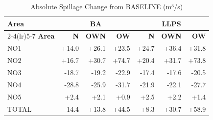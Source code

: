 \begin{table}[htbp]
\centering
\caption{Absolute Spillage Change from BASELINE (m³/s)}
\label{tab:spillage_abs_change}
\small
\begin{tabular}{lrrrrrr}
\toprule
\textbf{Area} & \multicolumn{3}{c}{\textbf{BA}} & \multicolumn{3}{c}{\textbf{LLPS}} \\
\cmidrule(lr){2-4}\cmidrule(lr){5-7}
\textbf{Area} & \textbf{N} & \textbf{OWN} & \textbf{OW} & \textbf{N} & \textbf{OWN} & \textbf{OW} \\
\midrule
NO1 & +14.0 & +26.1 & +23.5 & +24.7 & +36.4 & +31.8 \\
NO2 & +16.7 & +30.7 & +74.7 & +20.4 & +31.7 & +73.8 \\
NO3 & -18.7 & -19.2 & -22.9 & -17.4 & -17.6 & -20.5 \\
NO4 & -28.8 & -25.9 & -31.7 & -21.9 & -22.1 & -27.7 \\
NO5 & +2.4 & +2.1 & +0.9 & +2.5 & +2.2 & +1.4 \\
TOTAL & -14.4 & +13.8 & +44.5 & +8.3 & +30.7 & +58.9 \\
\bottomrule
\end{tabular}
\end{table}